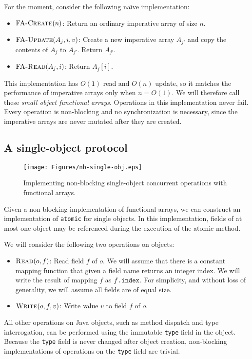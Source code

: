 \documentclass{csa-sig-alternate}
\newcommand{\atomic}{\texttt{atomic}\xspace}
\newcommand{\funcname}[1]{\ensuremath{\text{\sc #1}}}
\newcommand{\fref}[2]{\ensuremath{#1\text{\tt .#2}}}
\begin{document}
{For the moment, consider the following na{\"\i}ve implementation:
\begin{itemize}
\item $\funcname{FA-Create}(n)$: Return an ordinary imperative array of size
  $n$.
\item $\funcname{FA-Update}(A_j, i, v)$: Create a new imperative array
  $A_{j'}$ and copy the contents of $A_j$ to $A_{j'}$.  Return $A_{j'}$.
\item $\funcname{FA-Read}(A_j, i)$: Return $A_j[i]$.
\end{itemize}
This implementation has $O(1)$ read and $O(n)$ update, so it matches
the performance of imperative arrays only when $n=O(1)$.  We will
therefore call these \emph{small object functional arrays}.  Operations
in this implementation never fail.  Every operation is non-blocking
and no synchronization is necessary, since the imperative arrays are
never mutated after they are created.

\subsection{A single-object protocol}
\begin{figure}\centering
\texttt{[image: Figures/nb-single-obj.eps]}
\figadjust%
\caption{Implementing non-blocking single-object concurrent operations
  with functional arrays.}
\label{fig:single-o}
\end{figure}
Given a non-blocking implementation of functional arrays, we can
construct an implementation of \atomic for single objects.  In
this implementation, fields of at most one object may be referenced
during the execution of the atomic method.

We will consider the following two operations on objects:
\begin{itemize}
\item $\funcname{Read}(o, f)$: Read field $f$ of $o$.  We will assume that
  there is a constant mapping function that given a field name
  returns an integer index.  We will write the result of mapping $f$
  as \fref{f}{index}.  For simplicity, and without loss of generality,
  we will assume all fields are of equal size.
\item $\funcname{Write}(o, f, v)$: Write value $v$ to field $f$ of $o$.
\end{itemize}
All other operations on Java objects, such as method dispatch and type
interrogation, can be performed using the immutable {\tt type}
field in the object.  Because the {\tt type} field is never changed
after object creation, non-blocking implementations of operations on
the {\tt type} field are trivial.

}
\end{document}

